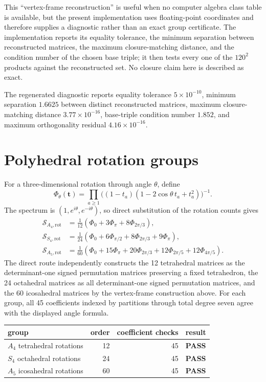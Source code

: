 \documentclass[11pt]{article}
\newcommand{\Sfun}{\mathcal S}
\newcommand{\PASS}{\textcolor{passgreen}{\textbf{PASS}}}
\begin{document}
This ``vertex-frame reconstruction'' is useful when no computer algebra class
table is available, but the present implementation uses floating-point
coordinates and therefore supplies a diagnostic rather than an exact group
certificate.  The implementation reports its equality tolerance, the minimum
separation between reconstructed matrices, the maximum closure-matching
distance, and the condition number of the chosen base triple; it then tests
every one of the $120^2$ products against the reconstructed set.  No closure
claim here is described as exact.

The regenerated diagnostic reports equality tolerance $5\times10^{-10}$,
minimum separation $1.6625$ between distinct reconstructed matrices, maximum
closure-matching distance $3.77\times10^{-16}$, base-triple condition number
$1.852$, and maximum orthogonality residual $4.16\times10^{-16}$.

\section{Polyhedral rotation groups}

For a three-dimensional rotation through angle $\theta$, define
\[
\Phi_\theta(\mathbf t)=\prod_{a\geq1}
\big((1-t_a)(1-2\cos\theta\,t_a+t_a^2)\big)^{-1}.
\]
The spectrum is $(1,e^{i\theta},e^{-i\theta})$, so direct substitution of the
rotation counts gives
\begin{align*}
\Sfun_{A_4,\mathrm{rot}}&=\frac1{12}
(\Phi_0+3\Phi_\pi+8\Phi_{2\pi/3}),\\
\Sfun_{S_4,\mathrm{rot}}&=\frac1{24}
(\Phi_0+6\Phi_{\pi/2}+8\Phi_{2\pi/3}+9\Phi_\pi),\\
\Sfun_{A_5,\mathrm{rot}}&=\frac1{60}
(\Phi_0+15\Phi_\pi+20\Phi_{2\pi/3}
+12\Phi_{2\pi/5}+12\Phi_{4\pi/5}).
\end{align*}
The direct route independently constructs the 12 tetrahedral matrices as the
determinant-one signed permutation matrices preserving a fixed tetrahedron,
the 24 octahedral matrices as all determinant-one signed permutation matrices,
and the 60 icosahedral matrices by the vertex-frame construction above.  For
each group, all 45 coefficients indexed by partitions through total degree
seven agree with the displayed angle formula.

\begin{center}
\begin{tabular}{@{}lrrc@{}}
\toprule
group & order & coefficient checks & result\\
\midrule
$A_4$ tetrahedral rotations & 12 & 45 & \PASS\\
$S_4$ octahedral rotations & 24 & 45 & \PASS\\
$A_5$ icosahedral rotations & 60 & 45 & \PASS\\
\bottomrule
\end{tabular}
\end{center}
\end{document}
